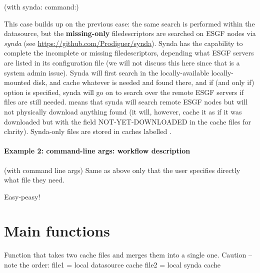 \documentclass[letterpaper,10pt,english]{sphinxmanual}
\begin{document}
(with synda: command:) 


This case builds up on the previous case: the same search is performed within the  datasource, but the \textbf{missing-only} filedescriptors are searched on ESGF nodes via \textsl{synda} (see \href{https://github.com/Prodiguer/synda}{https://github.com/Prodiguer/synda}). Synda has the capability to complete the incomplete or missing filedescriptors, depending what ESGF servers are listed in its configuration file (we will not discuss this here since that is a system admin issue). Synda will first search in the locally-available locally-mounted  disk, and cache whatever is needed and found there, and if (and only if)  option is specified, synda will go on to search over the remote ESGF servers if files are still needed.  means that synda will search remote ESGF nodes but will not physically download anything found (it will, however, cache it as if it was downloaded but with the field NOT-YET-DOWNLOADED in the cache files for clarity). Synda-only files are stored in caches labelled .


\paragraph{Example 2: command-line args: workflow description}
(with command line args) 
Same as above only that the user specifies directly what file they need.

Easy-peasy!

\section*{Main functions}


\begin{fulllineitems}
\label{\detokenize{index:cmip5datafinder.cache_merge}}
Function that takes two cache files and merges them
into a single one. Caution -- note the order:
file1 = local datasource cache
file2 = local synda cache

\end{fulllineitems}
\end{document}
